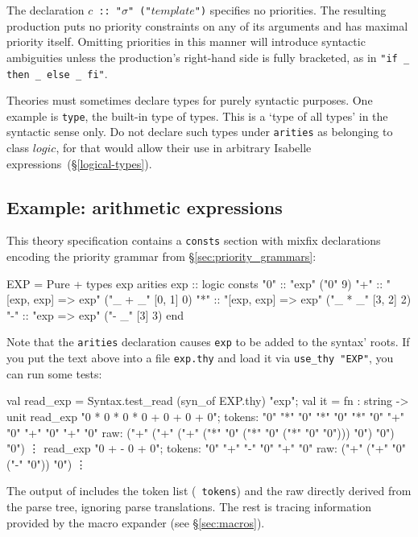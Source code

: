 The declaration {\tt $c$ ::\ "$\sigma$" ("$template$")} specifies no
priorities.  The resulting production puts no priority constraints on any
of its arguments and has maximal priority itself.  Omitting priorities in
this manner will introduce syntactic ambiguities unless the production's
right-hand side is fully bracketed, as in \verb|"if _ then _ else _ fi"|.

\begin{warn}
  Theories must sometimes declare types for purely syntactic purposes.  One
  example is {\tt type}, the built-in type of types.  This is a `type of
  all types' in the syntactic sense only.  Do not declare such types under
  {\tt arities} as belonging to class $logic$, for that would allow their
  use in arbitrary Isabelle expressions~(\S\ref{logical-types}).
\end{warn}

\subsection{Example: arithmetic expressions}
This theory specification contains a {\tt consts} section with mixfix
declarations encoding the priority grammar from
\S\ref{sec:priority_grammars}:
\begin{ttbox}
EXP = Pure +
types
  exp
arities
  exp :: logic
consts
  "0" :: "exp"                ("0"      9)
  "+" :: "[exp, exp] => exp"  ("_ + _"  [0, 1] 0)
  "*" :: "[exp, exp] => exp"  ("_ * _"  [3, 2] 2)
  "-" :: "exp => exp"         ("- _"    [3] 3)
end
\end{ttbox}
Note that the {\tt arities} declaration causes {\tt exp} to be added to the
syntax' roots.  If you put the text above into a file {\tt exp.thy} and load
it via {\tt use_thy "EXP"}, you can run some tests:
\begin{ttbox}
val read_exp = Syntax.test_read (syn_of EXP.thy) "exp";
{\out val it = fn : string -> unit}
read_exp "0 * 0 * 0 * 0 + 0 + 0 + 0";
{\out tokens: "0" "*" "0" "*" "0" "*" "0" "+" "0" "+" "0" "+" "0"}
{\out raw: ("+" ("+" ("+" ("*" "0" ("*" "0" ("*" "0" "0"))) "0") "0") "0")}
{\out \vdots}
read_exp "0 + - 0 + 0";
{\out tokens: "0" "+" "-" "0" "+" "0"}
{\out raw: ("+" ("+" "0" ("-" "0")) "0")}
{\out \vdots}
\end{ttbox}
The output of  includes the token list ({\tt
  tokens}) and the raw \AST{} directly derived from the parse tree,
ignoring parse \AST{} translations.  The rest is tracing information
provided by the macro expander (see \S\ref{sec:macros}).

